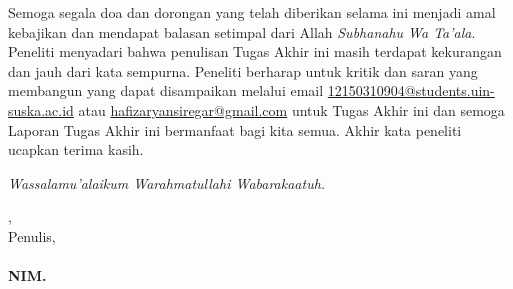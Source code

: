 Semoga segala doa dan dorongan yang telah diberikan selama ini menjadi amal kebajikan dan mendapat balasan setimpal dari Allah \textit{Subhanahu Wa Ta’ala}. Peneliti menyadari bahwa penulisan Tugas Akhir ini masih terdapat kekurangan dan jauh dari kata sempurna. Peneliti berharap untuk kritik dan saran yang membangun yang dapat disampaikan melalui email \href{mailto:12150310904@students.uin-suska.ac.id}{12150310904@students.uin-suska.ac.id} atau \href{mailto:hafizaryansiregar@gmail.com}{hafizaryansiregar@gmail.com} untuk Tugas Akhir ini dan semoga Laporan Tugas Akhir ini bermanfaat bagi kita semua. Akhir kata peneliti ucapkan terima kasih.

\textit{Wassalamu’alaikum Warahmatullahi Wabarakaatuh.}

\vspace*{0.1cm}

\begin{flushright}
	\kota, \tanggalPersetujuan\\
	Penulis,\\
	\vspace{2cm}
	\textbf{\underline{\penulis}\\
		NIM. \nim}

\end{flushright}
